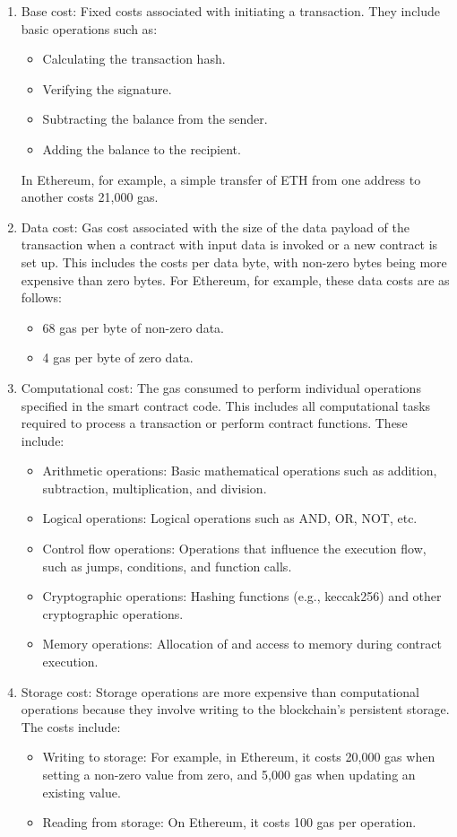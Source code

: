\documentclass[runningheads]{llncs}
\begin{document}
\begin{enumerate}
\item Base cost: Fixed costs associated with initiating a transaction. They include basic operations such as:
\begin{itemize}
\item Calculating the transaction hash.
\item Verifying the signature.
\item Subtracting the balance from the sender.
\item Adding the balance to the recipient.
\end{itemize}
In Ethereum, for example, a simple transfer of ETH from one address to another costs 21,000 gas.
\item Data cost: Gas cost associated with the size of the data payload of the transaction when a contract with input data is invoked or a new contract is set up. This includes the costs per data byte, with non-zero bytes being more expensive than zero bytes. For Ethereum, for example, these data costs are as follows:
\begin{itemize}
    \item 68 gas per byte of non-zero data.
    \item 4 gas per byte of zero data.
\end{itemize}

\item Computational cost: The gas consumed to perform individual operations specified in the smart contract code. This includes all computational tasks required to process a transaction or perform contract functions. These include:
\begin{itemize}
    \item Arithmetic operations: Basic mathematical operations such as addition, subtraction, multiplication, and division.
    \item Logical operations: Logical operations such as AND, OR, NOT, etc.
    \item Control flow operations: Operations that influence the execution flow, such as jumps, conditions, and function calls.
    \item Cryptographic operations: Hashing functions (e.g., keccak256) and other cryptographic operations.
    \item Memory operations: Allocation of and access to memory during contract execution.
\end{itemize}

\item Storage cost: Storage operations are more expensive than computational operations because they involve writing to the blockchain's persistent storage. The costs include:
\begin{itemize}
    \item Writing to storage: For example, in Ethereum, it costs 20,000 gas when setting a non-zero value from zero, and 5,000 gas when updating an existing value.
    \item Reading from storage: On Ethereum, it costs 100 gas per operation.
\end{itemize}


\end{enumerate}
\end{document}
